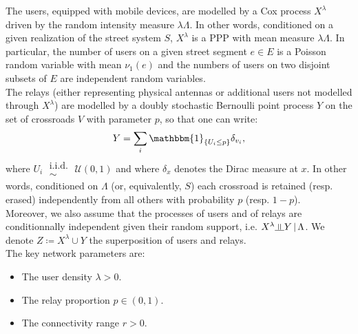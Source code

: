 \documentclass[10pt,a4paper]{amsart}
\theoremstyle{exampstyle}
\newtheorem{Proposition}{Proposition}
\newenvironment{Proof}{\noindent{\textit{Proof.}}}{%
\hspace*{\fill}$\Box$\par\vskip2ex}
\theoremstyle{exampnotations}
\newcommand{\indep}{\rotatebox[origin=c]{90}{$\models$}}
\begin{document}
The users, equipped with mobile devices, are modelled by a Cox process $X^{\lambda}$ driven by the random intensity measure $\lambda \Lambda$. In other words, conditioned on a given realization of the street system $S$, $X^{\lambda}$ is a PPP with mean measure $\lambda \Lambda$. In particular, the number of users on a given street segment $e \in E$ is a Poisson random variable with mean $\nu_{1}(e)$ and the numbers of users on two disjoint subsets of $E$ are independent random variables. \\
\indent The relays (either representing physical antennas or additional users not modelled through $X^{\lambda}$) are modelled by a doubly stochastic Bernoulli point process $Y$ on the set of crossroads $V$ with parameter $p$, so that one can write:
\begin{equation*}
Y = \sum_{i} \mathbbm{1}_{\lbrace U_{i} \leq p \rbrace } \delta_{v_{i}},
\end{equation*}
where $U_{i} \;\substack{ \text{i.i.d.} \\ \sim} \; \mathcal{U}(0,1)$ and where $\delta_{x}$ denotes the Dirac measure at $x$. In other words, conditioned on $\Lambda$ (or, equivalently, $S$) each crossroad is retained (resp. erased) independently from all others with probability $p$ (resp. $1-p$). \\
\noindent Moreover, we also assume that the processes of users and of relays  are conditionnally independent given their random support, i.e. $X^{\lambda} \indep Y \, \vert \,  \Lambda$. We denote $Z \coloneqq X^{\lambda} \cup Y$ the superposition of users and relays. \\

The key network parameters are:
\begin{itemize}
\item The user density $\lambda > 0$.
\item The relay proportion $p \in \left(0,1\right)$.
\item The connectivity range $r > 0$. \\
\end{itemize}
\end{document}
